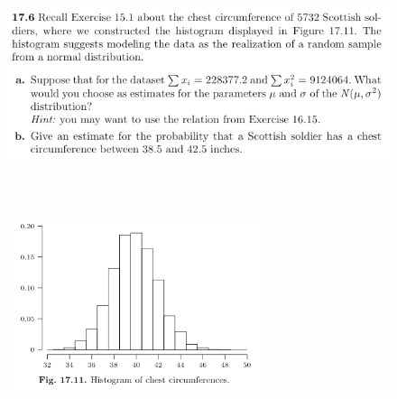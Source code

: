 \documentclass{article} %
\begin{document}
\begin{figure}[h!]
\centering
\includegraphics[width=5.5in, height=3in]{2.png}\\
\includegraphics[width=3in, height=2in]{3.png}\\
\end{figure}
\end{document}
